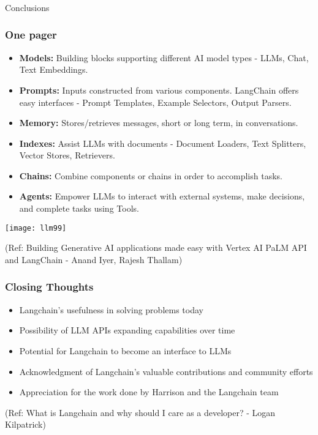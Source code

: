 \begin{frame}[fragile]\frametitle{}
\begin{center}
{\Large Conclusions}
\end{center}
\end{frame}

\begin{frame}[fragile]\frametitle{One pager}

\begin{itemize}
\item \textbf{Models:} Building blocks supporting different AI model types - LLMs, Chat, Text Embeddings.
\item \textbf{Prompts:} Inputs constructed from various components. LangChain offers easy interfaces - Prompt Templates, Example Selectors, Output Parsers.
\item \textbf{Memory:} Stores/retrieves messages, short or long term, in conversations.
\item \textbf{Indexes:} Assist LLMs with documents - Document Loaders, Text Splitters, Vector Stores, Retrievers.
\item \textbf{Chains:} Combine components or chains in order to accomplish tasks.
\item \textbf{Agents:} Empower LLMs to interact with external systems, make decisions, and complete tasks using Tools.
\end{itemize}

\begin{center}
\texttt{[image: llm99]}
\end{center}


{\tiny (Ref: Building Generative AI applications made easy with Vertex AI PaLM API and LangChain  - Anand Iyer, Rajesh Thallam)}

\end{frame}


\begin{frame}[fragile]\frametitle{Closing Thoughts}

\begin{itemize}
\item Langchain's usefulness in solving problems today
\item Possibility of LLM APIs expanding capabilities over time
\item Potential for Langchain to become an interface to LLMs
\item Acknowledgment of Langchain's valuable contributions and community efforts
\item Appreciation for the work done by Harrison and the Langchain team
\end{itemize}

{\tiny (Ref: What is Langchain and why should I care as a developer? - Logan Kilpatrick)}

\end{frame}
